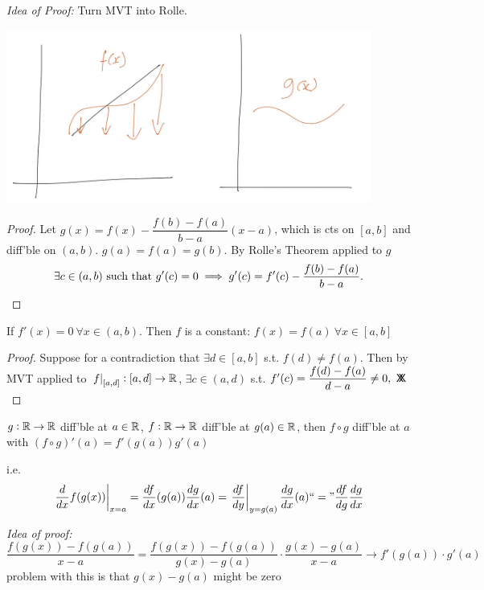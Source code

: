 \documentclass[twoside]{scrartcl}
\newcommand*{\cont}{%
  \mathsf{X}\mkern-8.5mu\mathsf{X}%
}
\begin{document}
\emph{Idea of Proof:} Turn MVT into Rolle. 

\begin{center}
\includegraphics[width = 12cm]{mvt2.jpg}
\end{center}

\begin{proof}
Let $g(x) = f(x) - \dfrac{f(b) - f(a)}{b-a}(x-a)$, which is cts on $[a,b]$ and diff'ble on $(a,b)$. $g(a) = f(a) = g(b)$. By Rolle's Theorem applied to $g$
\[\exists c \in (a,b)\text{ such that }g'(c) = 0 \implies g'(c) = f'(c) - \dfrac{f(b) - f(a)}{b-a}.\qedhere\]	
\end{proof}\vspace*{5pt}

\begin{corollary}
If $f'(x) = 0~\forall x \in (a,b)$. Then $f$ is a constant: $f(x) = f(a)~\forall x \in [a,b]$
\end{corollary}
\begin{proof}
Suppose for a contradiction that $\exists d \in[a,b]$ s.t. $f(d) \neq f(a)$. Then by MVT applied to $\left. f\right|_{[a,d]}: [a,d] \to \mathbb{R}$, $\exists c\in(a,d)$ s.t. $f'(c) = \dfrac{f(d) - f(a)}{d-a} \neq 0,~\cont$	
\end{proof}


\begin{theorem} $g: \mathbb{R} \to \mathbb{R}$ diff'ble at $a \in \mathbb{R}$, $f: \mathbb{R} \to \mathbb{R}$ diff'ble at $g(a) \in \mathbb{R}$, then $f \circ g$ diff'ble at $a$ with $(f\circ g)'(a) =f'(g(a))g'(a)$
\end{theorem}

i.e. \[\left.\frac{d}{dx} f(g(x))\right|_{x=a} = \frac{df}{dx} (g(a)) \frac{dg}{dx}(a) = \left.\frac{df}{dy}\right|_{y=g(a)}\frac{dg}{dx}(a) ``=" \frac{df}{dg}\frac{dg}{dx}\]

\emph{Idea of proof:} 
\[\frac{f(g(x))-f(g(a))}{x-a} = \frac{f(g(x)) - f(g(a))}{g(x) -g(a)}\cdot\frac{g(x)-g(a)}{x-a} \to f'(g(a))\cdot g'(a)\]
problem with this is that $g(x) - g(a)$ might be zero
\end{document}
